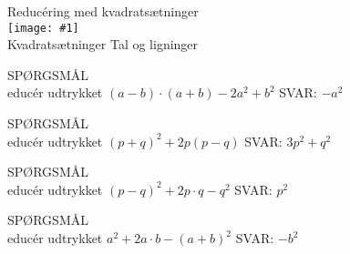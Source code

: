 \documentclass[]{article}
\newcounter{spgcounter}
\newenvironment{question}[2]{\addtocounter{spgcounter}{1} SPØRGSMÅL \thespgcounter\\}{\hspace{50px}}
\newcommand{\name}[1]{{\huge #1}\\}
\newcommand{\tag}[1]{#1}
\newcommand{\cover}[1]{\texttt{[image: \#1]}\\}
\newcommand{\answer}[1]{{\color{green} SVAR: #1}\\}
\begin{document}
\name{Reducéring med kvadratsætninger}
\cover{kvadratsætninger.png}
\tag{Kvadratsætninger}
\tag{Tal og ligninger}

\begin{question}{multi}
Reducér udtrykket $(a-b)\cdot (a+b) - 2 a^2 + b^2$
\answer{$-a^2$}
\end{question}

\begin{question}{multi}
Reducér udtrykket $(p+q)^2 + 2 p (p - q)$
\answer{$3 p^2 + q^2$}
\end{question}

\begin{question}{multi}
Reducér udtrykket $(p-q)^2+2p\cdot q - q^2$
\answer{$p^2$}
\end{question}

\begin{question}{multi}
Reducér udtrykket $a^2 + 2a \cdot b - (a+b)^2$
\answer{$-b^2$}
\end{question}
\end{document}
